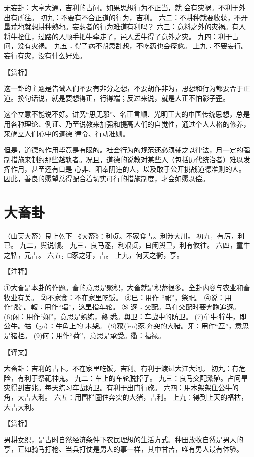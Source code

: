 \documentclass[a4paper,12pt,UTF8,twoside]{ctexbook}
\begin{document}
无妄卦：大亨大通，吉利的占问。如果思想行为不正当，就 会有灾祸。不利于外出有所往。
初九：不要有不合正道的行为，吉利。
六二：不耕种就要收获，不开垦荒地就想耕种熟地。妄想者的行为难道有利吗？
六三：意料之外的灾祸。有人将牛拴住，过路的人顺手把牛牵走了，邑人丢牛得了意外之灾。
九四：利于占问，没有灾祸。
九五：得了病不胡思乱想，不吃药也会痊愈。
上九：不要妄行。妄行有灾，没有什么好处。

【赏析】

这一卦的主题是告诫人们不要有非分之想，不要胡作非为，思想和行为都要合于正道。换句话说，就是要想得正，行得端；反过来说，就是人正不怕影子歪。

这个立意不能说不好。讲究“思无邪”、名正言顺、光明正大的中国传统思想，总是用各种理论、例证、乃至说教来加强和提高人们的自觉性，通过个人人格的修养，来确立人们心中的道德 律令、行动准则。

但是，道德的作用毕竟是有限的。社会行为的规范还必须辅之以律法，月一定的强制措施来制约那些越轨者。况且，道德的说教对某些人（包括历代统治者）难以发挥作用，甚至还有口是 心非、阳奉阴违的人，以及敢于公开挑战道德准则的人。因此，善良的愿望总得配合着切实可行的措施制度，才会如愿以偿。

\chapter{大畜卦}

（山天大畜）艮上乾下
《大畜》：利贞。不家食吉。利涉大川。
初九，有厉，利已。
九二，舆说輹。
九三，良马逐，利艰贞，曰闲舆卫，利有攸往。
六四，童牛之牿，元吉。
六五，□豕之牙，吉。
上九，何天之衢，亨。

【注释】

①大畜是本卦的作题。畜的意思是聚积，大畜就是积蓄很多。全卦内容与农业和畜牧业有关。
②不家食：不在家里吃饭。
③巳：用作 “祀”，祭祀。
④说：用作“脱”。輹：用作“辐”，这里指车轮。
⑤ 逐：交配。马在交配时要奔跑追逐。
(6)闲：用作“娴”，意思是熟练，熟 悉。舆卫：车战中的防卫。
(7)童牛:犝牛，即公牛。牯（gu）：牛角上的 木架。
(8)豮(fen)豕:奔突的大猪。牙：用作“互”，意思是猪栏。
(9)何；用作“荷”，意思是承受。衢：福禄。

【译文】

大畜卦：吉利的占卜。不在家里吃饭，吉利。有利于渡过大江大河。
初九：有危险，有利于祭祀神鬼。
九二：车上的车轮脱掉了。
九三：良马交配繁殖。占问旱灾得到吉兆。每天练习车战防卫。有利于出门行旅。
六四：用木架架住公牛的角，大吉大利。
六五：用围栏圈住奔突的大猪，吉利。
上九：得到上天的福枯，大吉大利。

【赏析】

男耕女织，是古时自然经济条件下农民理想的生活方式。种田放牧自然是男人的亨，正如骑马打枪、当兵打仗是男人的事一样，其中甘苦，唯有男人最有体验。
\end{document}
